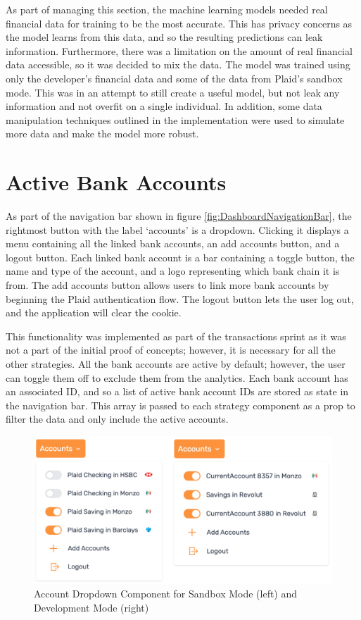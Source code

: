 As part of managing this section, the machine learning models needed real financial data for training to be the most accurate. This has privacy concerns as the model learns from this data, and so the resulting predictions can leak information. Furthermore, there was a limitation on the amount of real financial data accessible, so it was decided to mix the data. The model was trained using only the developer's financial data and some of the data from Plaid's sandbox mode. This was in an attempt to still create a useful model, but not leak any information and not overfit on a single individual. In addition, some data manipulation techniques outlined in the implementation were used to simulate more data and make the model more robust.

\section{Active Bank Accounts}
As part of the navigation bar shown in figure \ref{fig:DashboardNavigationBar}, the rightmost button with the label `accounts' is a dropdown. Clicking it displays a menu containing all the linked bank accounts, an add accounts button, and a logout button. Each linked bank account is a bar containing a toggle button, the name and type of the account, and a logo representing which bank chain it is from. The add accounts button allows users to link more bank accounts by beginning the Plaid authentication flow. The logout button lets the user log out, and the application will clear the cookie.

This functionality was implemented as part of the transactions sprint as it was not a part of the initial proof of concepts; however, it is necessary for all the other strategies. All the bank accounts are active by default; however, the user can toggle them off to exclude them from the analytics. Each bank account has an associated ID, and so a list of active bank account IDs are stored as state in the navigation bar. This array is passed to each strategy component as a prop to filter the data and only include the active accounts.

\begin{figure}[H]
	\centering
	\includegraphics[width=\textwidth]{images/accounts_dropdown.png}
	\caption{Account Dropdown Component for Sandbox Mode (left) and Development Mode (right)}
	\label{fig:AccountsDropdown}
\end{figure}

